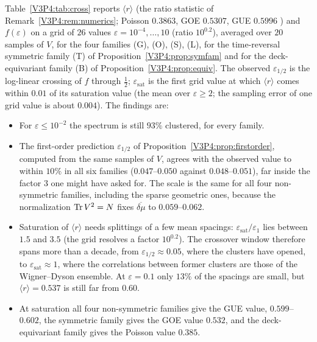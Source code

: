 \begin{remark}\label{V3P4:rem:crossover}
Table~\ref{V3P4:tab:cross} reports $\langle r\rangle$ (the ratio statistic of
Remark~\ref{V3P4:rem:numerics}; Poisson $0.3863$, GOE $0.5307$, GUE $0.5996$ \cite{Atas13}) and
$f(\varepsilon)$ on a grid of $26$ values $\varepsilon=10^{-4},\dots,10$ (ratio $10^{0.2}$),
averaged over $20$ samples of $V$, for the four families (G), (O), (S), (L), for the time-reversal
symmetric family (T) of Proposition~\ref{V3P4:prop:symfam} and for the deck-equivariant family
(B) of Proposition~\ref{V3P4:prop:equiv}. The observed $\varepsilon_{1/2}$ is the log-linear
crossing of $f$ through $\tfrac12$; $\varepsilon_{\mathrm{sat}}$ is the first grid value at
which $\langle r\rangle$ comes within $0.01$ of its saturation value (the mean over
$\varepsilon\ge2$; the sampling error of one grid value is about $0.004$). The findings are:
\begin{itemize}
\item[(1)] For $\varepsilon\le10^{-2}$ the spectrum is still $93\%$ clustered, for every family.
\item[(2)] The first-order prediction $\varepsilon_{1/2}$ of Proposition~\ref{V3P4:prop:firstorder},
computed from the same samples of $V$, agrees with the observed value to within $10\%$ in all six
families ($0.047$--$0.050$ against $0.048$--$0.051$), far inside the factor $3$ one might have
asked for. The scale is the same for all four non-symmetric families, including the sparse
geometric ones, because the normalization $\operatorname{Tr} V^{2}=N$ fixes $\overline{\delta\mu}$ to
$0.059$--$0.062$.
\item[(3)] Saturation of $\langle r\rangle$ needs splittings of a few mean spacings:
$\varepsilon_{\mathrm{sat}}/\varepsilon_1$ lies between $1.5$ and $3.5$ (the grid resolves a
factor $10^{0.2}$). The crossover window therefore spans more than a decade, from
$\varepsilon_{1/2}\approx0.05$, where the clusters have opened, to
$\varepsilon_{\mathrm{sat}}\approx1$, where the correlations between former clusters are those of
the Wigner--Dyson ensemble. At $\varepsilon=0.1$ only $13\%$ of the spacings are small, but
$\langle r\rangle=0.537$ is still far from $0.60$.
\item[(4)] At saturation all four non-symmetric families give the GUE value, $0.599$--$0.602$,
the symmetric family gives the GOE value $0.532$, and the deck-equivariant family gives the Poisson
value $0.385$.
\end{itemize}
\end{remark}

